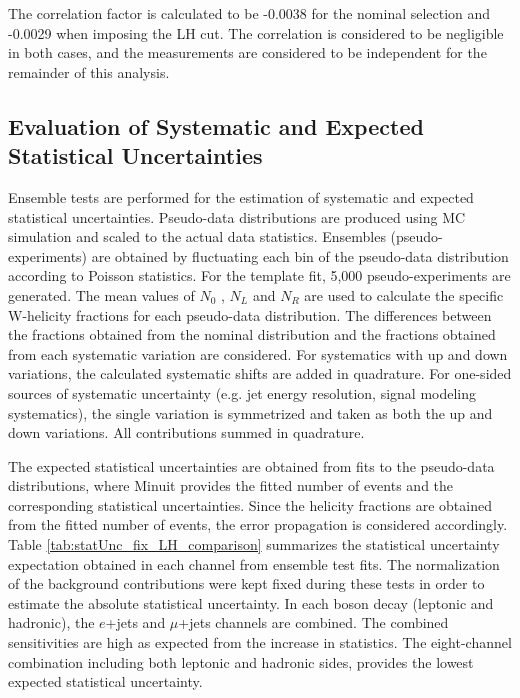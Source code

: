 The correlation factor is calculated to be -0.0038 for the nominal selection and -0.0029 when imposing the LH cut. The correlation is considered to be negligible in both cases, and the measurements are considered to be independent for the remainder of this analysis.

\subsection{Evaluation of Systematic and Expected Statistical Uncertainties}
\label{sec:statisticalUnc}
 Ensemble tests are performed for the estimation of systematic and expected statistical uncertainties. Pseudo-data distributions are produced using MC simulation and scaled to the actual data statistics. Ensembles (pseudo-experiments) are obtained by fluctuating each bin of the pseudo-data distribution according to Poisson statistics. For the template fit, 5,000 pseudo-experiments are generated. The mean values of $N_{0}$ , $N_{L}$ and $N_{R}$ are used to calculate the specific W-helicity fractions for each pseudo-data distribution. The differences between the fractions obtained from the nominal distribution and the fractions obtained from each systematic variation are considered. For systematics with up and down variations, the calculated systematic shifts are added in quadrature. For one-sided sources of systematic uncertainty (e.g. jet energy resolution, signal modeling systematics), the single variation is symmetrized and taken as both the up and down variations. All contributions summed in quadrature.
 
 The expected statistical uncertainties are obtained from fits to the pseudo-data distributions, where {\sc Minuit} provides the fitted number of events and the corresponding statistical uncertainties. Since the helicity fractions are obtained from the fitted number of events, the error propagation is considered accordingly. Table \ref{tab:statUnc_fix_LH_comparison} summarizes the statistical uncertainty expectation obtained in each channel from ensemble test fits. The normalization of the background contributions were kept fixed during these tests in order to estimate the absolute statistical uncertainty. %
 In each \w boson decay (leptonic and hadronic), the $e$+jets and $\mu$+jets channels are combined. The combined sensitivities are high as expected from the increase in statistics. The eight-channel combination including both leptonic and hadronic sides, provides the lowest expected statistical uncertainty. %

